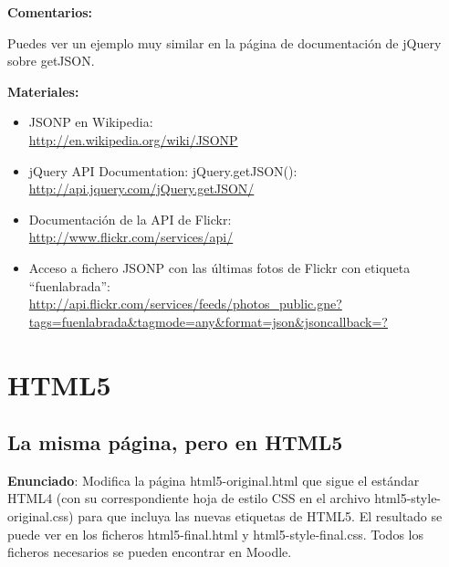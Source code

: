 \textbf{Comentarios:}

Puedes ver un ejemplo muy similar en la página de documentación de jQuery sobre getJSON.

\textbf{Materiales:}

\begin{itemize}
\item JSONP en Wikipedia: \\
  \url{http://en.wikipedia.org/wiki/JSONP}
\item jQuery API Documentation: jQuery.getJSON(): \\
  \url{http://api.jquery.com/jQuery.getJSON/}
\item Documentación de la API de Flickr: \\
  \url{http://www.flickr.com/services/api/}
\item Acceso a fichero JSONP con las últimas fotos de Flickr con etiqueta ``fuenlabrada'': \\
  \url{http://api.flickr.com/services/feeds/photos_public.gne?tags=fuenlabrada&tagmode=any&format=json&jsoncallback=?}
\end{itemize}


\section{HTML5}

\subsection{La misma página, pero en HTML5}
\label{subsec:lo-mismo-pero-diferente}

\textbf{Enunciado}: Modifica la página html5-original.html que sigue el estándar HTML4
(con su correspondiente hoja de estilo CSS en el archivo html5-style-original.css)
para que incluya las nuevas etiquetas de HTML5. El resultado se puede ver en los
ficheros html5-final.html y html5-style-final.css. Todos los ficheros necesarios se
pueden encontrar en Moodle.


